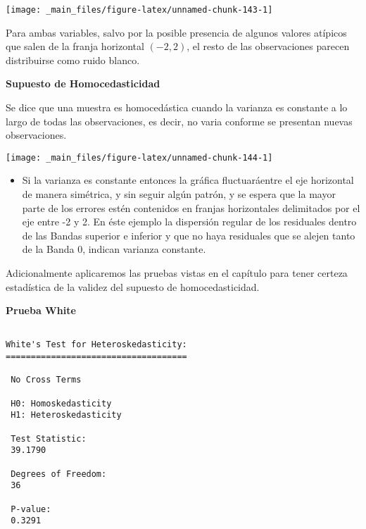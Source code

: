 \documentclass[
  a4paper,
  oneside,
  openany]{book}
\newenvironment{Shaded}{\begin{snugshade}}{\end{snugshade}}
\newcommand{\AttributeTok}[1]{\textcolor[rgb]{0.77,0.63,0.00}{#1}}
\newcommand{\DecValTok}[1]{\textcolor[rgb]{0.00,0.00,0.81}{#1}}
\newcommand{\FunctionTok}[1]{\textcolor[rgb]{0.00,0.00,0.00}{#1}}
\newcommand{\NormalTok}[1]{#1}
\newcommand{\OtherTok}[1]{\textcolor[rgb]{0.56,0.35,0.01}{#1}}
\newcommand{\SpecialCharTok}[1]{\textcolor[rgb]{0.00,0.00,0.00}{#1}}
\providecommand{\tightlist}{%
  \setlength{\itemsep}{0pt}\setlength{\parskip}{0pt}}
\begin{document}
\begin{center}\texttt{[image: \_main\_files/figure-latex/unnamed-chunk-143-1]} \end{center}

Para ambas variables, salvo por la posible presencia de algunos valores atípicos que salen de la franja horizontal \((-2,2)\), el resto de las observaciones parecen distribuirse como ruido blanco.

\textbf{Supuesto de Homocedasticidad}

Se dice que una muestra es homocedástica cuando la varianza es constante a lo largo de todas las observaciones, es decir, no varia conforme se presentan nuevas observaciones.

\begin{center}\texttt{[image: \_main\_files/figure-latex/unnamed-chunk-144-1]} \end{center}

\begin{itemize}
\tightlist
\item
  Si la varianza es constante entonces la gráfica fluctuaráentre el eje horizontal de manera simétrica, y sin seguir algún patrón, y se espera que la mayor parte de los errores estén contenidos en franjas horizontales delimitados por el eje entre -2 y 2. En éste ejemplo la dispersión regular de los residuales dentro de las Bandas superior e inferior y que no haya residuales que se alejen tanto de la Banda 0, indican varianza constante.
\end{itemize}

Adicionalmente aplicaremos las pruebas vistas en el capítulo para tener certeza estadística de la validez del supuesto de homocedasticidad.

\textbf{Prueba White}

\begin{Shaded}
\end{Shaded}

\begin{verbatim}

White's Test for Heteroskedasticity:
==================================== 

 No Cross Terms

 H0: Homoskedasticity
 H1: Heteroskedasticity

 Test Statistic:
 39.1790 

 Degrees of Freedom:
 36 

 P-value:
 0.3291 
\end{verbatim}
\end{document}
